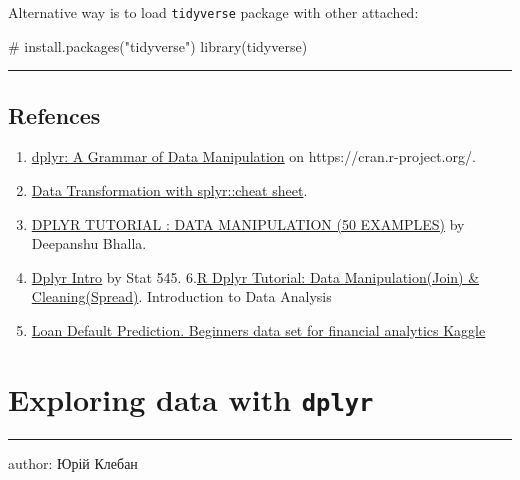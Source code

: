 \documentclass[
  letterpaper,
  DIV=11,
  numbers=noendperiod]{scrreprt}
\newenvironment{Shaded}{\begin{snugshade}}{\end{snugshade}}
\newcommand{\CommentTok}[1]{\textcolor[rgb]{0.37,0.37,0.37}{#1}}
\newcommand{\FunctionTok}[1]{\textcolor[rgb]{0.28,0.35,0.67}{#1}}
\newcommand{\NormalTok}[1]{\textcolor[rgb]{0.00,0.23,0.31}{#1}}
\providecommand{\tightlist}{%
  \setlength{\itemsep}{0pt}\setlength{\parskip}{0pt}}\usepackage{longtable,booktabs,array}
\begin{document}
Alternative way is to load \texttt{tidyverse} package with other
attached:

\begin{Shaded}
\begin{Highlighting}[]
\CommentTok{\# install.packages("tidyverse")}
\FunctionTok{library}\NormalTok{(tidyverse)}
\end{Highlighting}
\end{Shaded}

\begin{center}\rule{0.5\linewidth}{0.5pt}\end{center}

\section{Refences}\label{refences}

\begin{enumerate}
\def\labelenumi{\arabic{enumi}.}
\tightlist
\item
  \href{https://cran.r-project.org/web/packages/dplyr/index.html}{dplyr:
  A Grammar of Data Manipulation} on https://cran.r-project.org/.
\item
  \href{https://github.com/rstudio/cheatsheets/blob/master/data-transformation.pdf}{Data
  Transformation with splyr::cheat sheet}.
\item
  \href{https://www.listendata.com/2016/08/dplyr-tutorial.html}{DPLYR
  TUTORIAL : DATA MANIPULATION (50 EXAMPLES)} by Deepanshu Bhalla.
\item
  \href{https://stat545.com/dplyr-intro.html}{Dplyr Intro} by Stat 545.
  6.\href{https://www.guru99.com/r-dplyr-tutorial.html}{R Dplyr
  Tutorial: Data Manipulation(Join) \& Cleaning(Spread)}. Introduction
  to Data Analysis
\item
  \href{https://www.kaggle.com/kmldas/loan-default-prediction}{Loan
  Default Prediction. Beginners data set for financial analytics Kaggle}
\end{enumerate}

\chapter{\texorpdfstring{Exploring data with
\texttt{dplyr}}{Exploring data with dplyr}}\label{exploring-data-with-dplyr}

\begin{center}\rule{0.5\linewidth}{0.5pt}\end{center}

author: Юрій Клебан
\end{document}
